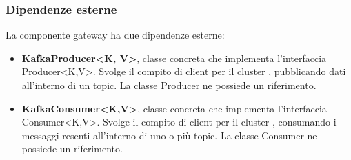 	\subsubsection{Dipendenze esterne}	
		La componente gateway ha due dipendenze esterne: 
			\begin{itemize}
				\item \textbf{KafkaProducer<K, V>}, classe concreta che implementa l'interfaccia Producer<K,V>. Svolge il compito di client per il cluster , pubblicando dati all'interno di un topic. La classe Producer ne possiede un riferimento.
				\item \textbf{KafkaConsumer<K,V>}, classe concreta che implementa l'interfaccia Consumer<K,V>. Svolge il compito di client per il cluster , consumando i messaggi resenti all'interno di uno o più topic. La classe Consumer ne possiede un riferimento.
			\end{itemize}	
		\newpage		

